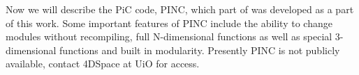 	Now we will describe the PiC code, PINC, which part of was developed as
	a part of this work. Some important features of PINC include the ability
	to change modules without recompiling, full N-dimensional functions as well
	as special 3-dimensional functions and built in modularity. Presently PINC is
	not publicly available, contact 4DSpace at UiO for access.
